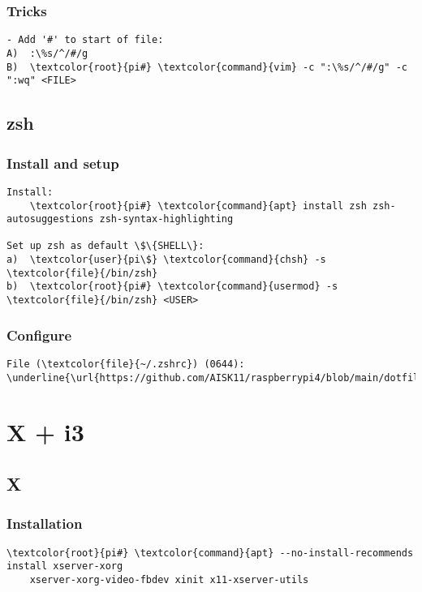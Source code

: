 \documentclass[10pt, a4paper, onecolumn, openany]{book} %
\begin{document}
\subsection{Tricks}
\begin{Verbatim}[commandchars=\\\{\}]
- Add '#' to start of file:
A)  :\%s/^/#/g
B)  \textcolor{root}{pi#} \textcolor{command}{vim} -c ":\%s/^/#/g" -c ":wq" <FILE>
\end{Verbatim}

\section{zsh}
\subsection{Install and setup}
\begin{Verbatim}[commandchars=\\\{\}]
Install:
    \textcolor{root}{pi#} \textcolor{command}{apt} install zsh zsh-autosuggestions zsh-syntax-highlighting
    
Set up zsh as default \$\{SHELL\}:
a)  \textcolor{user}{pi\$} \textcolor{command}{chsh} -s \textcolor{file}{/bin/zsh}
b)  \textcolor{root}{pi#} \textcolor{command}{usermod} -s \textcolor{file}{/bin/zsh} <USER>
\end{Verbatim}
\subsection{Configure}
\begin{Verbatim}[commandchars=\\\{\}]
File (\textcolor{file}{~/.zshrc}) (0644):
\underline{\url{https://github.com/AISK11/raspberrypi4/blob/main/dotfiles/.zshrc}}
\end{Verbatim}


\chapter{X + i3}
\section{X}
\subsection{Installation}
\begin{Verbatim}[commandchars=\\\{\}]
    \textcolor{root}{pi#} \textcolor{command}{apt} --no-install-recommends install xserver-xorg
    xserver-xorg-video-fbdev xinit x11-xserver-utils
\end{Verbatim}
\end{document}
